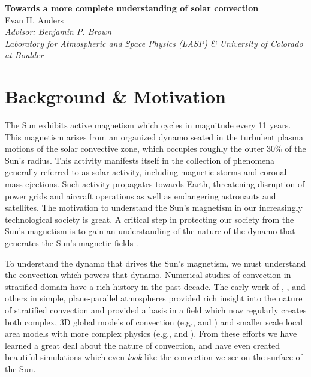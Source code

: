 \documentclass[aasms,12pt]{article}
\begin{document}
\begin{center}
   \large\textbf{Towards a more complete understanding of solar convection}\\
   \vspace{0.4cm}
   \large{Evan H. Anders}\\
   \vspace{0.4cm}
   \normalsize\textit{Advisor: Benjamin P. Brown}\\
   \normalsize\textit{Laboratory for Atmospheric and Space Physics (LASP) \& University of Colorado at Boulder}\\
\end{center}

\section{Background \& Motivation}
The Sun exhibits active magnetism which cycles in magnitude every 11 years.
This magnetism arises from an 
organized dynamo seated in the turbulent plasma
motions of the solar convective zone, which occupies roughly the outer 30\%
of the Sun's radius. This activity manifests itself in the collection of phenomena generally
referred to as solar activity, including magnetic storms and coronal mass
ejections.  Such activity propagates towards Earth, threatening disruption of 
power grids and aircraft operations as well as endangering astronauts and satellites.
The motivation to understand the Sun's magnetism in our increasingly technological society
is great.  A critical step in protecting our society from the Sun's magnetism is 
to gain an understanding of the nature of the dynamo that generates the Sun's magnetic fields
\cite{nordlund&all2009, charbonneau2014}.

To understand the dynamo that drives the Sun's magnetism, we must understand the convection
which powers that dynamo.  Numerical studies of convection in stratified domain have a
rich history in the past decade.  The early work of \cite{graham1975}, \cite{hurlburt&all1984},
and others in simple, plane-parallel atmospheres
provided rich insight into the nature of stratified convection and provided a basis
in a field which now regularly creates both complex, 3D global models of convection
(e.g., \cite{brown&all2010} and \cite{guerrero&all2016})
and smaller scale local area models with more complex physics 
(e.g., \cite{stein&nordlund2012} and \cite{rempel2014}).
From these efforts we have learned a great deal about the nature of convection, and have
even created beautiful simulations which even \emph{look} like the convection we see on the
surface of the Sun.
\end{document}
